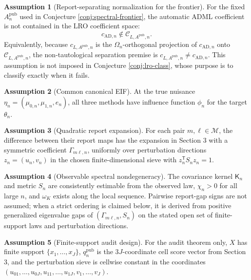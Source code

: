 \documentclass[11pt]{article}
\newcommand{\transpose}{\mathsf{T}}
\theoremstyle{definition}
\newtheorem{assumption}{Assumption}
\theoremstyle{plain}
\theoremstyle{remark}
\begin{document}
\begin{assumption}[Report-separating normalization for the frontier]\label{ass:lro-separated}
For the fixed \(A_n^{\mathrm{pub}}\) used in Conjecture
\ref{conj:spectral-frontier}, the automatic ADML coefficient is not contained
in the LRO coefficient space:
\[
c_{\mathrm{AD},n}\notin \mathcal C_{L,A^{\mathrm{pub}},n}.
\]
Equivalently, because \(c_{L,A^{\mathrm{pub}},n}\) is the
\(\Omega_n\)-orthogonal projection of \(c_{\mathrm{AD},n}\) onto
\(\mathcal C_{L,A^{\mathrm{pub}},n}\), the non-tautological separation premise
is \(c_{L,A^{\mathrm{pub}},n}\ne c_{\mathrm{AD},n}\).  This assumption is not
imposed in Conjecture
\ref{conj:lro-class}, whose purpose is to classify exactly when it fails.
\end{assumption}

\begin{assumption}[Common canonical EIF]\label{ass:eif}
At the true nuisance \(\eta_n=(\mu_{0,n},\mu_{1,n},e_n)\), all three
methods have influence function \(\phi_n\) for the target \(\theta_n\).
\end{assumption}

\begin{assumption}[Quadratic report expansion]\label{ass:quadratic}
For each pair \(m,\ell\in\mathcal M\), the difference between their report
maps has the expansion in Section 3 with a symmetric coefficient
\(\Gamma_{m\ell,n}\), uniformly over perturbation directions \(z_n=(u_n,v_n)\)
in the chosen finite-dimensional sieve with \(z_n^{\transpose}S_nz_n=1\).
\end{assumption}

\begin{assumption}[Observable spectral nondegeneracy]\label{ass:spectral}
The covariance kernel \(\mathsf K_n\) and metric \(S_n\) are consistently estimable
from the observed law, \(\chi_n>0\) for all large \(n\), and \(\omega_K\)
exists along the local sequence.  Pairwise report-gap signs are not assumed;
when a strict ordering is claimed below, it is derived from positive
generalized eigenvalue gaps of \((\Gamma_{m\ell,n},S_n)\) on the stated open
set of finite-support laws and perturbation directions.
\end{assumption}

\begin{assumption}[Finite-support audit design]\label{ass:finite-audit}
For the audit theorem only, \(X\) has finite support
\(\{x_1,\ldots,x_J\}\), \(q^{\mathrm{pub}}_n\) is the \(3J\)-coordinate cell
score vector from Section 3, and the perturbation sieve is cellwise constant
in the coordinates
\((u_{01},\ldots,u_{0J},u_{11},\ldots,u_{1J},v_1,\ldots,v_J)\).
\end{assumption}
\end{document}
